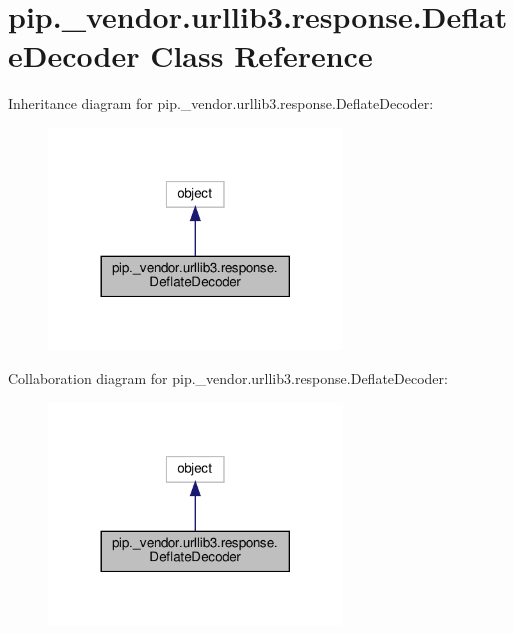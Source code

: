 \hypertarget{classpip_1_1__vendor_1_1urllib3_1_1response_1_1DeflateDecoder}{}\section{pip.\+\_\+vendor.\+urllib3.\+response.\+Deflate\+Decoder Class Reference}
\label{classpip_1_1__vendor_1_1urllib3_1_1response_1_1DeflateDecoder}


Inheritance diagram for pip.\+\_\+vendor.\+urllib3.\+response.\+Deflate\+Decoder\+:
\nopagebreak
\begin{figure}[H]
\begin{center}
\leavevmode
\includegraphics[width=221pt]{classpip_1_1__vendor_1_1urllib3_1_1response_1_1DeflateDecoder__inherit__graph}
\end{center}
\end{figure}


Collaboration diagram for pip.\+\_\+vendor.\+urllib3.\+response.\+Deflate\+Decoder\+:
\nopagebreak
\begin{figure}[H]
\begin{center}
\leavevmode
\includegraphics[width=221pt]{classpip_1_1__vendor_1_1urllib3_1_1response_1_1DeflateDecoder__coll__graph}
\end{center}
\end{figure}
